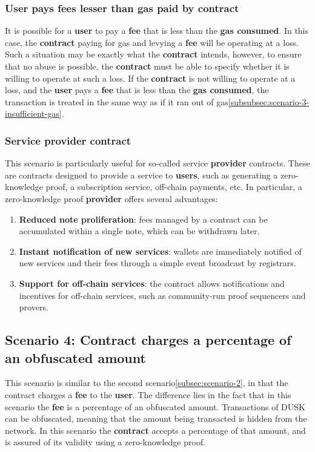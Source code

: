 \documentclass[twocolumn, nofootinbib]{revtex4-2} %
\newcommand{\dusk}{{\footnotesize\textsf{DUSK}}\xspace}
\newcommand{\emphasize}[1]{\textbf{#1}\xspace}
\newcommand{\contract}{\emphasize{contract}}
\newcommand{\fee}{\emphasize{fee}}
\newcommand{\gasconsumed}{\emphasize{gas consumed}}
\newcommand{\provider}{\emphasize{provider}}
\newcommand{\user}{\emphasize{user}}
\newcommand{\users}{\emphasize{users}}
\begin{document}
    \subsubsection*{User pays fees lesser than gas paid by contract}\label{subsubsec:scenario-3-user-pays-fees-lesser}
    It is possible for a \user to pay a \fee that is less than the \gasconsumed.
    In this case, the \contract paying for gas and levying a \fee will be
    operating at a loss.
    Such a situation may be exactly what the \contract intends, however, to
    ensure that no abuse is possible, the \contract must be able to specify
    whether it is willing to operate at such a loss.
    If the \contract is not willing to operate at a loss, and the \user pays
    a \fee that is less than the \gasconsumed, the transaction is treated in
    the same way as if it ran out of gas\ref{subsubsec:scenario-3-insufficient-gas}.

    \subsubsection*{Service provider contract}\label{subsubsec:scenario-3-service-provider-contract}
    This scenario is particularly useful for so-called service \provider contracts.
    These are contracts designed to provide a service to \users, such as
    generating a zero-knowledge proof, a subscription service, off-chain
    payments, etc.
    In particular, a zero-knowledge proof \provider offers several advantages:

    \begin{enumerate}
        \item \textbf{Reduced note proliferation}: fees managed by a contract
        can be accumulated within a single note, which can be withdrawn
        later.
        \item \textbf{Instant notification of new services}: wallets are
        immediately notified of new services and their fees through a
        simple event broadcast by registrars.
        \item \textbf{Support for off-chain services}: the contract allows
        notifications and incentives for off-chain services, such as
        community-run proof sequencers and provers.
    \end{enumerate}

    \subsection*{Scenario 4: Contract charges a percentage of an obfuscated amount}\label{subsec:scenario-4}
    This scenario is similar to the second scenario\ref{subsec:scenario-2}, in
    that the contract charges a \fee to the \user.
    The difference lies in the fact that in this scenario the \fee is a
    percentage of an obfuscated amount.
    Transactions of \dusk can be obfuscated, meaning that the amount being
    transacted is hidden from the network.
    In this scenario the \contract accepts a percentage of that amount, and
    is assured of its validity using a zero-knowledge proof.
\end{document}
